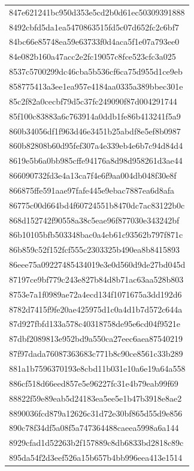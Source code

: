 \begin{tabular}{l}
847e621241bc950d353e5cd2b0d61ec50309391888 \\
8492cbfd5da1ea5470863515fd5c07d652fc2c6bf7 \\
84bc66e85748ea59e63733f0d4aca5f1e07a793ee0 \\
84e082b160a47acc2e2fc19057c8fce523cfc3a025 \\
8537c5700299dc46cba5b536cf6ca75d955d1ce9eb \\
858775413a3ee1ea957e4184aa0335a389bbec301e \\
85c2f82a0cecbf79d5c37fc249090f87d004291744 \\
85f100c83883a6c763914a0ddb1fe86b413241f5a9 \\
860b34056df1f963d46e3451b25abdf8e5ef8b0987 \\
860b82808b60d95fef307a4e339eb4e6b7c94d84d4 \\
8619e5b6a0bb985cffe94176a8d98d958261d3ae44 \\
866090732fd3e4a13ca7f4e6f9aa004db048f30e8f \\
866875ffe591aae97fafe445e9ebac7887ea6d8afa \\
86775c00d664bd4f60724551b8470dc7ac83122b0c \\
868d152742f90558a38c5eae96f877030e343242bf \\
86b10105bfb503348bac0a4eb61c93562b797f871c \\
86b859c52f152fcf555c2303325b490ea8b8415893 \\
86eee75a09227485434019e3e0d560d9de27bd045d \\
87197ce9bf779c243e827b84d8b71ac63aa528b803 \\
8753e7a1f0989ae72a4ecd134f1071675a3dd192d6 \\
8782d7415f9fe20ae425975d1c0a4d1b7d572c644a \\
87d927fbfd133a578c40318758de95e6cd04f9521e \\
87dbf2089813e952bd9a550ca27eec6aea87540219 \\
87f97dada76087363683c771b8c90ce8561c33b289 \\
881a1b7596370193e8cbd11b031e10a6e19a64a558 \\
886cf518d66eed857e5e96227fc31e4b79eab99f69 \\
88822f59e89eab5d24183ea5ee5e1b47b3918e8ae2 \\
8890036fcd879a12626c31d72e30bf865d55d9e856 \\
890c78f34df5a08f5a747364488caeea5998a6a144 \\
8929cfad1d52263b2f157889c8db6833bd2818c89c \\
895da54f2d3eef526a15b657b4bb996eea413e1514 \\

\end{tabular}
